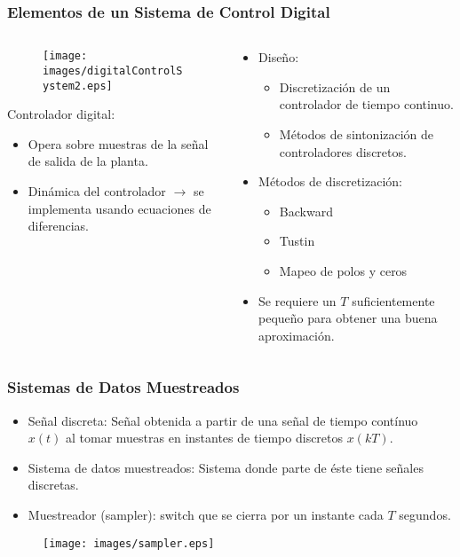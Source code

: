 \documentclass[aspectratio=169,handout]{beamer}
\theoremstyle{definition}
\theoremstyle{plain}
\theoremstyle{remark}
\begin{document}
\begin{frame}[<+->]\frametitle{Elementos de un Sistema de Control Digital}
	\vspace*{-2mm}
	\begin{columns}
		\begin{column}{0.5\textwidth}
			\begin{figure}
				\centering
				\texttt{[image: images/digitalControlSystem2.eps]}
			\end{figure}
			Controlador digital:
			\begin{itemize}
				\item Opera sobre muestras de la señal de salida de la planta.
				\item Dinámica del controlador $\rightarrow$ se implementa usando ecuaciones de diferencias.
			\end{itemize}
		\end{column}
		\begin{column}{0.5\textwidth}
			\begin{itemize}
				\item Diseño:
				\begin{itemize}
					\item Discretización de un controlador de tiempo continuo.
					\item Métodos de sintonización de controladores discretos.
				\end{itemize}
				\item Métodos de discretización:
				\begin{itemize}
					\item Backward
					\item Tustin
					\item Mapeo de polos y ceros
				\end{itemize}
				\item Se requiere un $T$ suficientemente pequeño para obtener una buena aproximación.
			\end{itemize}
		\end{column}
	\end{columns}
\end{frame}

\begin{frame}[<+->]\frametitle{Sistemas de Datos Muestreados}
	\vspace*{3mm}
	\begin{itemize}
		\item Señal discreta: Señal obtenida a partir de una señal de tiempo contínuo $x(t)$ al tomar muestras en instantes de tiempo discretos $x(kT)$.
		\item Sistema de datos muestreados: Sistema donde parte de éste tiene señales discretas.
		\item Muestreador (sampler): switch que se cierra por un instante cada $T$ segundos.
	\end{itemize}
	\begin{figure}
		\centering
		\texttt{[image: images/sampler.eps]}
	\end{figure}
\end{frame}
\end{document}
